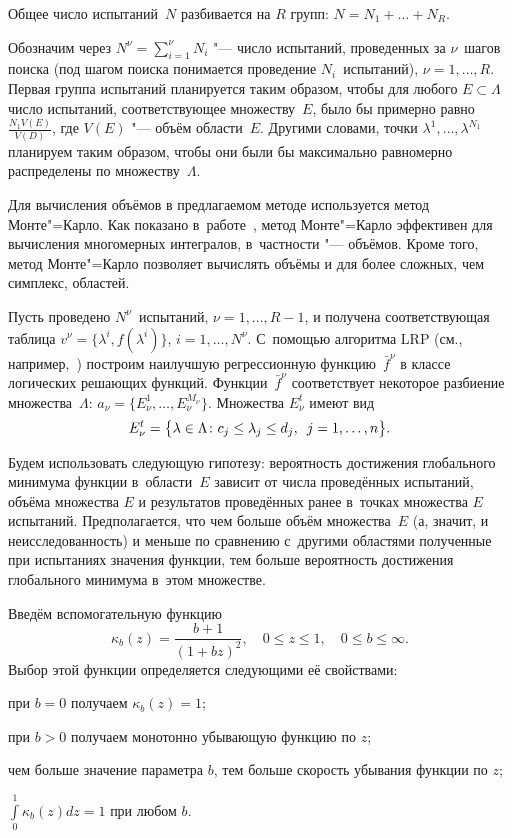 \documentclass[twoside]{article}
\begin{document}
Общее число испытаний~$N$ разбивается на $R$ групп:
$ N=N_{1} + \ldots +N_{R}.$

Обозначим через $N^{\nu}=\sum\limits_{i=1}^{\nu}N_{i}$ "--- число
испытаний, проведенных за $\nu$~шагов поиска (под шагом поиска
понимается проведение  $N_{i}$~испытаний), ${\nu=1,\ldots,R}$.
Первая группа испытаний планируется таким образом, чтобы для
любого $E\subset  \Lambda$  число  испытаний, соответствующее множеству~$E$,
было бы примерно равно $\frac{N_{1} V(E)}{V(D)}$, где $V(E)$ "--- объём области~$E$.
Другими словами, точки $\lambda^{1},\ldots,\lambda^{N_{1}}$ планируем таким
образом, чтобы они были бы максимально равномерно  распределены по множеству~$\Lambda$.


Для вычисления объёмов в предлагаемом методе используется метод Монте"=Карло.
Как показано в~работе~\cite{bibBook3}, метод Монте"=Карло эффективен для вычисления
многомерных интегралов, в~частности "--- объёмов. Кроме того, метод Монте"=Карло позволяет
вычислять объёмы и для более сложных, чем симплекс, областей.


Пусть проведено $N^{\nu}$~испытаний, $\nu=1,\ldots,R{-}1$, и получена
соответствующая таблица $v^{\nu}=\{\lambda^{i},f(\lambda^{i})\}$,\; $i=1,\ldots,N^{\nu}$.
С~помощью алгоритма LRP (см., например,~\cite{bibBook1}) построим наилучшую регрессионную
функцию~$\bar{f}^{\nu}$ в классе логических решающих функций.
Функции~$\bar{f}^{\nu}$
соответствует некоторое разбиение множества~$\Lambda$:\; $a_{\nu}=\{E^{1}_{\nu},\ldots,
E^{M_{\nu}}_{\nu}\}$.
Множества $E^{t}_{\nu}$ имеют вид
$$E^{t}_{\nu}=\bigl\{ \lambda\in\Lambda\colon c_j \leq \lambda_j \leq d_j,\enskip j=1,\ldots,n \bigr\}.$$

Будем использовать следующую гипотезу: вероятность достижения глобального минимума функции
в~области~$E$  зависит от числа проведённых испытаний, объёма множества $E$ и результатов
проведённых ранее в~точках множества $E$ испытаний. Предполагается, что чем больше объём
множества~$E$ (а, значит, и неисследованность) и меньше по сравнению с~другими областями
полученные при испытаниях значения функции, тем больше вероятность достижения глобального
минимума в~этом множестве.


Введём вспомогательную функцию
$$\kappa_{b}(z)=\frac{b+1}{(1+bz)^{2}},\quad 0 \leq z \leq 1,
\quad 0  \leq b \leq \infty.$$
Выбор этой функции определяется следующими её свойствами:
\begin{enumerate*}
    \item {при $b=0$ получаем $\kappa_{b}(z)=1$;}
    \item {при $b>0$ получаем монотонно убывающую функцию по $z$;}
    \item {чем больше значение параметра  $b$, тем больше скорость
убывания функции по $z$;}
    \item {$\int\limits_{0}^{1}\kappa_{b}(z)dz=1$ при любом $b$.}
\end{enumerate*}
\end{document}
